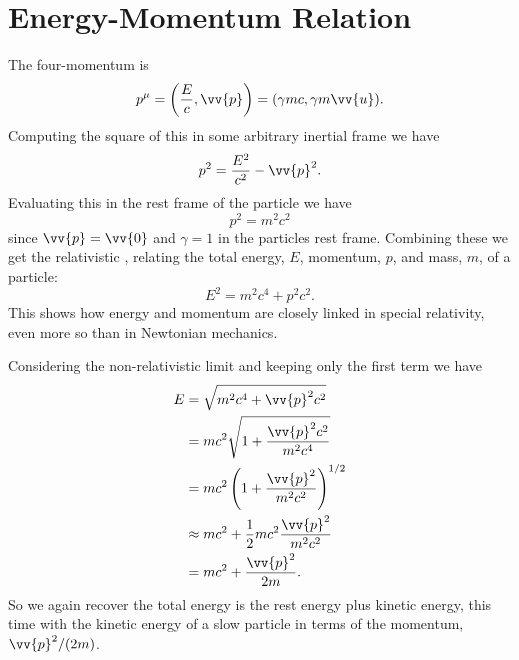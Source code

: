 \documentclass[fleqn]{NotesClass}
\begin{document}
    \section{Energy-Momentum Relation}
    The four-momentum is
    \begin{equation}
        p^\mu = \left( \frac{E}{c}, \vv{p} \right) = (\gamma mc, \gamma m\vv{u}).
    \end{equation}
    Computing the square of this in some arbitrary inertial frame we have
    \begin{equation}
        p^2 = \frac{E^2}{c^2} - \vv{p}^2.
    \end{equation}
    Evaluating this in the rest frame of the particle we have
    \begin{equation}
        p^2 = m^2c^2
    \end{equation}
    since \(\vv{p} = \vv{0}\) and \(\gamma = 1\) in the particles rest frame.
    Combining these we get the relativistic , relating the total energy, \(E\), momentum, \(p\), and mass, \(m\), of a particle:
    \begin{equation}
        E^2 = m^2c^4 + p^2c^2.
    \end{equation}
    This shows how energy and momentum are closely linked in special relativity, even more so than in Newtonian mechanics.
    
    Considering the non-relativistic limit and keeping only the first term we have
    \begin{align}
        E &= \sqrt{m^2c^4 + \vv{p}^2c^2}\\
        &= mc^2\sqrt{1 + \frac{\vv{p}^2c^2}{m^2c^4}}\\
        &= mc^2 \left( 1 + \frac{\vv{p}^2}{m^2c^2} \right)^{1/2}\\
        &\approx mc^2 + \frac{1}{2}mc^2\frac{\vv{p}^2}{m^2c^2}\\
        &= mc^2 + \frac{\vv{p}^2}{2m}.
    \end{align}
    So we again recover the total energy is the rest energy plus kinetic energy, this time with the kinetic energy of a slow particle in terms of the momentum, \(\vv{p}^2/(2m)\).
    
\end{document}
